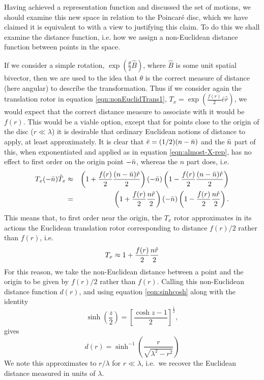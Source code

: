 Having achieved a representation function and discussed
the set of motions, we should examine this new space in
relation to the Poincar\'e disc, which we have claimed it is
equivalent to with a view to justifying this claim.
To do this we shall examine the distance
function, i.e. how we assign a non-Euclidean distance
function between points in the space.

If we consider a simple rotation,
$\exp\left(\frac{\theta}{2}\hat{B}\right)$, where $\hat{B}$ is some unit
spatial bivector, then we are used to the idea that
$\theta$ is the correct measure of distance (here
angular) to describe the transformation. Thus if we
consider again the translation rotor in
equation \ref{eqn:nonEuclidTrans1}, $T_x = \exp\left(\frac{f(r)}{2}\bar{e}\hat{r}\right)$,
%
%
we would expect that the correct distance
measure to associate with it would be $f(r)$. This would be a
viable option, except that for points close to the origin of the
disc ($r\ll\lambda$) it is desirable that ordinary Euclidean notions of
distance to apply, at least approximately. It is clear that $\bar{e} =
(1/2)(n-\bar{n})$ and the $\bar{n}$ part of this, when exponentiated and
applied as in equation \ref{eqn:almost-X-rep}, has no effect to
first order on the origin point $-\bar{n}$, whereas the $n$ part does,
i.e.
%
\begin{eqnarray}
T_x(-\bar{n})\tilde{T}_x & \approx  & \left(1+
\frac{f(r)}{2}\frac{(n-\bar{n})\hat{r}}{2}\right)(-\bar{n})\left(1-
\frac{f(r)}{2}\frac{(n-\bar{n})\hat{r}}{2}\right)   \nonumber \\
 & =  &
\left(1+
\frac{f(r)}{2}\frac{n\hat{r}}{2}\right)(-\bar{n})\left(1 -
\frac{f(r)}{2}\frac{n\hat{r}}{2}\right).
\end{eqnarray}
%
This means that, to first order near the origin, the
$T_x$ rotor approximates in its actions the Euclidean
translation rotor corresponding to distance $f(r)/2$
rather than $f(r)$, i.e.
%
\begin{equation}
T_x \approx 1 + \frac{f(r)}{2}\frac{n \hat{r}}{2}
\end{equation}
%
For this reason, we take the non-Euclidean distance
between a point and the origin to be given by $f(r)/2$
rather than $f(r)$. Calling this non-Euclidean distance
function $d(r)$, and using equation
\ref{eqn:sinhcosh} along with the identity 
\[\sinh\left(\frac{z}{2}\right) =
\left[\frac{\cosh z - 1}{2}\right]^{\frac{1}{2}},\]
gives
%
\begin{equation} \label{eqn:defines-dofr}
d(r) =
\sinh^{-1}\left(\frac{r}{\sqrt{\lambda^2-r^2}}\right)
\end{equation}
%
We note this approximates to $r/\lambda$ for
$r\ll\lambda$, i.e.\ we recover the Euclidean distance
measured in units of $\lambda$.


